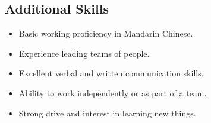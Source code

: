 \documentclass[letterpaper, 10pt]{article}
\begin{document}
\subsection{Additional Skills}
\vspace{-1.25em}
\begin{multicols}{2}
\begin{itemize}[nolistsep]
\item Basic working proficiency in Mandarin Chinese.
\item Experience leading teams of people.
\item Excellent verbal and written communication skills.
\item Ability to work independently or as part of a team.
\item Strong drive and interest in learning new things.
\end{itemize}
\end{multicols}
\end{document}
